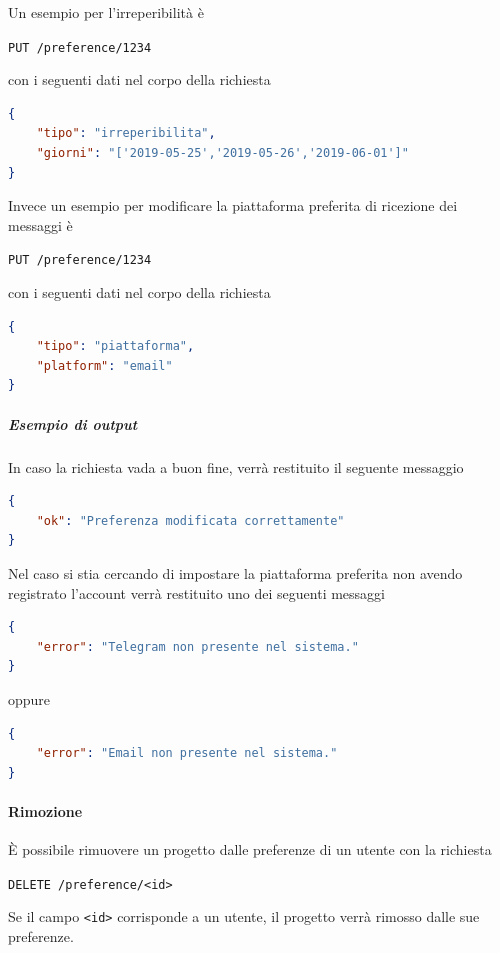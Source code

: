     Un esempio per l'irreperibilità è
    \begin{center}
	    \texttt{PUT /preference/1234}
    \end{center}
    con i seguenti dati nel corpo della richiesta
	\begin{lstlisting}[language = json]
{
    "tipo": "irreperibilita",
    "giorni": "['2019-05-25','2019-05-26','2019-06-01']"
}
    \end{lstlisting}

    Invece un esempio per modificare la piattaforma preferita di ricezione dei messaggi è
    \begin{center}
	    \texttt{PUT /preference/1234}
    \end{center}
    con i seguenti dati nel corpo della richiesta
	\begin{lstlisting}[language = json]
{
    "tipo": "piattaforma",
    "platform": "email"
}
    \end{lstlisting}

    \subparagraph{Esempio di output}
    In caso la richiesta vada a buon fine, verrà restituito il seguente messaggio
	\begin{lstlisting}[language = json]
{
    "ok": "Preferenza modificata correttamente"
}
	\end{lstlisting}

	Nel caso si stia cercando di impostare la piattaforma preferita non avendo registrato l'account verrà restituito uno dei seguenti messaggi
	\begin{lstlisting}[language = json]
{
    "error": "Telegram non presente nel sistema."
}
	\end{lstlisting}

	oppure

	\begin{lstlisting}[language = json]
{
    "error": "Email non presente nel sistema."
}
	\end{lstlisting}

\paragraph{Rimozione}

È possibile rimuovere un progetto dalle preferenze di un utente con la richiesta
\begin{center}
    \texttt{DELETE /preference/<id>}
\end{center}

Se il campo \texttt{<id>} corrisponde a un utente, il progetto verrà rimosso dalle sue preferenze.

